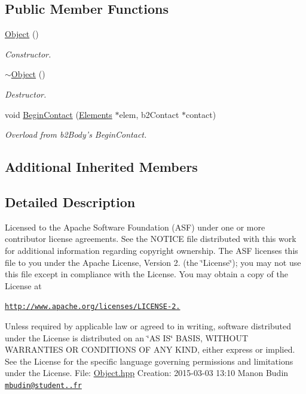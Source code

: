 \subsection*{Public Member Functions}
\begin{DoxyCompactItemize}
\item 
\hyperlink{class_object_a40860402e64d8008fb42329df7097cdb}{Object} ()
\begin{DoxyCompactList}\small\item\em Constructor. \end{DoxyCompactList}\item 
\hyperlink{class_object_ae8f5483f459e46687bd01e6f9977afd3}{$\sim$\-Object} ()
\begin{DoxyCompactList}\small\item\em Destructor. \end{DoxyCompactList}\item 
void \hyperlink{class_object_a5681745b50d64994e00fe519bbb4cd31}{Begin\-Contact} (\hyperlink{class_elements}{Elements} $\ast$elem, b2\-Contact $\ast$contact)
\begin{DoxyCompactList}\small\item\em Overload from b2\-Body's Begin\-Contact. \end{DoxyCompactList}\end{DoxyCompactItemize}
\subsection*{Additional Inherited Members}


\subsection{Detailed Description}
Licensed to the Apache Software Foundation (A\-S\-F) under one or more contributor license agreements. See the N\-O\-T\-I\-C\-E file distributed with this work for additional information regarding copyright ownership. The A\-S\-F licenses this file to you under the Apache License, Version 2. (the \char`\"{}\-License\char`\"{}); you may not use this file except in compliance with the License. You may obtain a copy of the License at

\href{http://www.apache.org/licenses/LICENSE-2.0}{\tt http\-://www.\-apache.\-org/licenses/\-L\-I\-C\-E\-N\-S\-E-\/2.}

Unless required by applicable law or agreed to in writing, software distributed under the License is distributed on an \char`\"{}\-A\-S I\-S\char`\"{} B\-A\-S\-I\-S, W\-I\-T\-H\-O\-U\-T W\-A\-R\-R\-A\-N\-T\-I\-E\-S O\-R C\-O\-N\-D\-I\-T\-I\-O\-N\-S O\-F A\-N\-Y K\-I\-N\-D, either express or implied. See the License for the specific language governing permissions and limitations under the License. File\-: \hyperlink{_object_8hpp_source}{Object.\-hpp} Creation\-: 2015-\/03-\/03 13\-:10 Manon Budin \href{mailto:mbudin@student.42.fr}{\tt mbudin@student..\-fr} 

